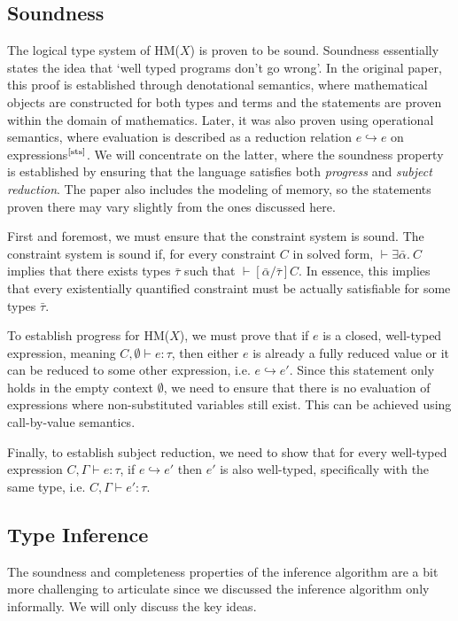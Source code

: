 \documentclass[runningheads]{llncs}
\newcommand{\hmx}{HM($X$)}
\begin{document}
\subsection{Soundness}
The logical type system of \hmx{} is proven to be sound. Soundness essentially
states the idea that `well typed programs don't go wrong'.
In the original paper,
this proof is established through denotational semantics, where mathematical
objects are constructed for both types and terms and the statements are proven
within the domain of mathematics. Later, it was also proven using operational
semantics, where evaluation is described as a reduction relation $e ↪ e$ on
expressions$^\text{\cite{sts}}$.
We will concentrate on the latter, where the soundness property is established
by ensuring that the language satisfies both \emph{progress} and \emph{subject
  reduction}.
The paper also includes the modeling of memory, so the statements
proven there may vary slightly from the ones discussed here.

First and foremost, we must ensure that the constraint system is sound. The
constraint system is sound if, for every constraint $C$ in solved form, $⊢
  ∃\bar{α}. \ C$
implies that there exists types $\bar{τ}$ such that
$⊢ [\bar{α}/\bar{τ}]C$.
In essence, this implies that every existentially quantified constraint must be
actually satisfiable for some types $\bar{τ}$.

To establish progress for \hmx{}, we must prove that if $e$ is a closed,
well-typed expression, meaning $C, ∅ ⊢ e : τ$, then either $e$ is already a
fully reduced value or it can be reduced to some other expression,
i.e. $e ↪ e'$. Since this statement only holds in the empty context $∅$, we
need to ensure that there is no evaluation of expressions where non-substituted
variables still exist. This can be achieved using call-by-value semantics.

Finally, to establish subject reduction, we need to show that for every
well-typed expression $C, Γ ⊢ e : τ$, if $e ↪ e'$ then $e'$ is also well-typed,
specifically with the same type, i.e. $C, Γ ⊢ e' : τ$.

\subsection{Type Inference}
The soundness and completeness properties of the inference algorithm are a bit
more challenging to articulate since we discussed the inference algorithm only
informally. We will only discuss the key ideas.
\end{document}
